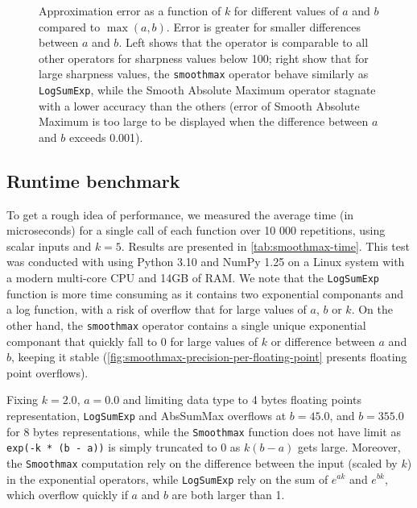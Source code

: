 \begin{figure}[H]
    \centering
    \caption{Approximation error as a function of $k$ for different values of $a$ and $b$ compared to $\max(a, b)$. Error is greater for smaller differences between $a$ and $b$. Left shows that the operator is comparable to all other operators for sharpness values below 100; right show that for large sharpness values, the \texttt{smoothmax} operator behave similarly as \texttt{LogSumExp}, while the Smooth Absolute Maximum operator stagnate with a lower accuracy than the others (error of Smooth Absolute Maximum is too large to be displayed when the difference between $a$ and $b$ exceeds 0.001). }
    \label{fig:smoothmax-sharpness}
\end{figure}

\subsection*{Runtime benchmark}

To get a rough idea of performance, we measured the average time (in microseconds) for a single call of each function over 10 000 repetitions, using scalar inputs and $k = 5$. Results are presented in \cref{tab:smoothmax-time}. This test was conducted with using Python 3.10 and NumPy 1.25 on a Linux system with a modern multi-core CPU and 14GB of RAM. We note that the \texttt{LogSumExp} function is more time consuming as it contains two exponential componants and a log function, with a risk of overflow that for large values of $a$, $b$ or $k$. On the other hand, the \texttt{smoothmax} operator contains a single unique exponential componant that quickly fall to 0 for large values of $k$ or difference between $a$ and $b$, keeping it stable (\cref{fig:smoothmax-precision-per-floating-point} presents floating point overflows). 

Fixing $k = 2.0$, $a = 0.0$ and limiting data type to 4 bytes floating points representation, \texttt{LogSumExp} and AbsSumMax overflows at $b = 45.0$, and $b = 355.0$ for 8 bytes representations, while the \texttt{Smoothmax} function does not have limit as \texttt{exp(-k * (b - a))} is simply truncated to 0 as $k (b - a)$ gets large. Moreover, the \texttt{Smoothmax} computation rely on the difference between the input (scaled by $k$) in the exponential operators, while \texttt{LogSumExp} rely on the sum of $e^{ak}$ and $e^{bk}$, which overflow quickly if $a$ and $b$ are both larger than 1.

